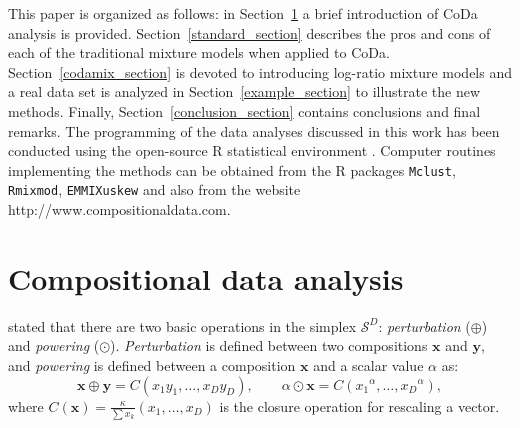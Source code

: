 \documentclass[12pt, a4paper]{article}
\theoremstyle{definition}
\begin{document}
This paper is organized as follows: in Section~\ref{coda_section} a brief introduction of CoDa analysis is provided. Section~\ref{standard_section} describes the pros and cons of each of the traditional mixture models when applied to CoDa. Section~\ref{codamix_section} is devoted to introducing log-ratio mixture models and a real data set is analyzed in Section~\ref{example_section} to illustrate the new methods. Finally, Section~\ref{conclusion_section} contains conclusions and final remarks. The programming of the data analyses discussed in this work has been conducted using the open-source R statistical environment \citep{R2014soft}. Computer routines implementing the methods can be obtained from the R packages \texttt{Mclust}, \texttt{Rmixmod}, \texttt{EMMIXuskew} and also from the website http://www.compositionaldata.com.




\section{Compositional data analysis}
\label{coda_section}


 \noindent \cite{aitchison1986statistical} stated that  there are two basic operations in the simplex $\mathcal{S}^D$: \emph{perturbation} ($\oplus$) and 
 \emph{powering} ($\odot$). \emph{Perturbation} is defined between two compositions $\textbf{x}$ 
and $\textbf{y}$,  and \emph{powering} is defined between a composition $\textbf{x}$ and a scalar value $\alpha$ as:
\begin{equation}
\textbf{x} \oplus \textbf{y} =  C( x_1 y_1, \dots, x_D y_D), \qquad \alpha
 \odot \textbf{x} =  C( {x_1}^\alpha, \dots, {x_D}^\alpha),
\label{pert_pow}
\end{equation}
where $C(\textbf{x})=\frac{\kappa}{\sum x_k}(x_1, \dots, x_D) $ is the closure operation for rescaling a vector.
\end{document}
